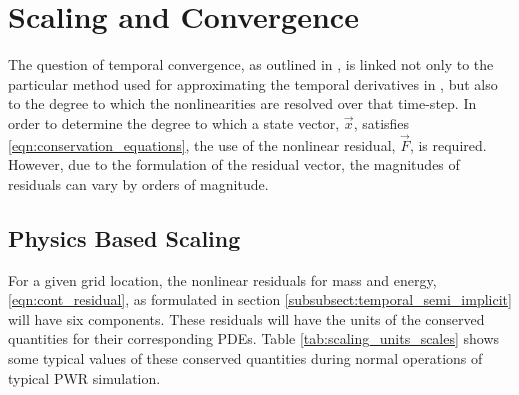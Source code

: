 \chapter{Scaling and Convergence}
\label{chap:scaling_and_convergence}
The question of temporal convergence, as outlined in , is linked not only to the particular method used for approximating the temporal derivatives in , but also to the degree to which the nonlinearities are resolved over that time-step. 
In order to determine the degree to which a state vector, $\vec{x}$, satisfies \eqref{eqn:conservation_equations}, the use of the nonlinear residual, $\vec{F}$, is required.
However, due to the formulation of the residual vector, the magnitudes of residuals can vary by orders of magnitude.

\section{Physics Based Scaling}
\label{sect:scaling}
For a given grid location, the nonlinear residuals for mass and energy, \eqref{eqn:cont_residual}, as formulated in section \ref{subsubsect:temporal_semi_implicit} will have six components.
These residuals will have the units of the conserved quantities for their corresponding PDEs.
Table \ref{tab:scaling_units_scales} shows some typical values of these conserved quantities during normal operations of typical PWR simulation.

